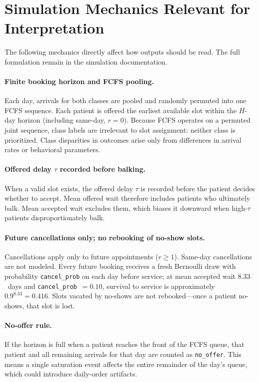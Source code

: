 \documentclass[11pt]{article}
\begin{document}
\section{Simulation Mechanics Relevant for Interpretation}
\label{sec:mechanics}

The following mechanics directly affect how outputs should be read. The full
formulation remain in the simulation documentation.

\paragraph{Finite booking horizon and FCFS pooling.}
Each day, arrivals for both classes are pooled and randomly permuted into one
FCFS sequence. Each patient is offered the earliest available slot within the
$H$-day horizon (including same-day, $r=0$). Because FCFS operates on a
permuted joint sequence, class labels are irrelevant to slot assignment:
neither class is prioritized. Class disparities in outcomes arise only from
differences in arrival rates or behavioral parameters.

\paragraph{Offered delay $\tau$ recorded before balking.}
When a valid slot exists, the offered delay $\tau$ is recorded before the
patient decides whether to accept. Mean offered wait therefore includes
patients who ultimately balk. Mean accepted wait excludes them, which biases
it downward when high-$\tau$ patients disproportionately balk.

\paragraph{Future cancellations only; no rebooking of no-show slots.}
Cancellations apply only to future appointments ($r \geq 1$). Same-day
cancellations are not modeled. Every future booking receives a fresh
Bernoulli draw with probability \texttt{cancel\_prob} on each day before
service; at mean accepted wait $8.33$~days and \texttt{cancel\_prob}~$=0.10$,
survival to service is approximately $0.9^{8.33}=0.416$. Slots vacated by
no-shows are not rebooked---once a patient no-shows, that slot is lost.

\paragraph{No-offer rule.}
If the horizon is full when a patient reaches the front of the FCFS queue,
that patient and all remaining arrivals for that day are counted as
\texttt{no\_offer}. This means a single saturation event affects the entire
remainder of the day's queue, which could introduce daily-order artifacts.
\end{document}
